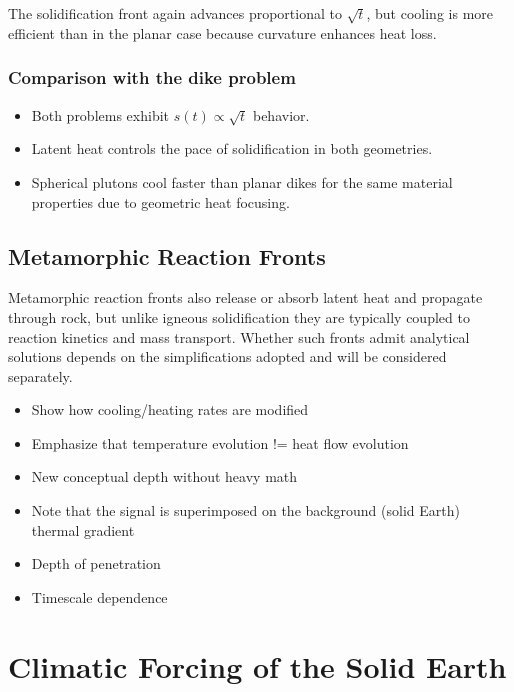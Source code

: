 The solidification front again advances proportional to $\sqrt{t}$, but cooling is
more efficient than in the planar case because curvature enhances heat loss.

\subsubsection*{Comparison with the dike problem}

\begin{itemize}
\item Both problems exhibit $s(t) \propto \sqrt{t}$ behavior.
\item Latent heat controls the pace of solidification in both geometries.
\item Spherical plutons cool faster than planar dikes for the same material
properties due to geometric heat focusing.
\end{itemize}

\subsection{Metamorphic Reaction Fronts}

Metamorphic reaction fronts also release or absorb latent heat and propagate through rock, but unlike igneous solidification they are typically coupled to reaction kinetics and mass transport. Whether such fronts admit analytical solutions depends on the simplifications adopted and will be considered separately.
\begin{itemize}
    \item Show how cooling/heating rates are modified
    \item Emphasize that temperature evolution != heat flow evolution
    \item New conceptual depth without heavy math

    \item Note that the signal is superimposed on the background (solid Earth) thermal gradient
    \item Depth of penetration
    \item Timescale dependence
\end{itemize}

\section{Climatic Forcing of the Solid Earth}

